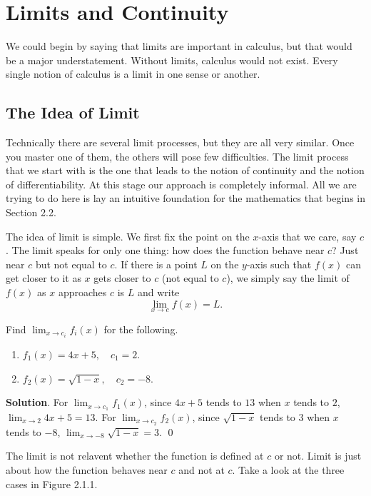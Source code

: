 \documentclass[11pt]{book}
\theoremstyle{break}
\theoremstyle{no_label}
\numberwithin{equation}{section}
\begin{document}
\setlength{\delimitershortfall}{13.5pt}

\chapter{Limits and Continuity}

We could begin by saying that limits are important in calculus, but that would be a major understatement. Without limits, calculus would not exist. Every single notion of calculus is a limit in one sense or another.

\section{The Idea of Limit}

Technically there are several limit processes, but they are all very similar. Once you master one of them, the others will pose few difficulties. The limit process that we start with is the one that leads to the notion of continuity and the notion of differentiability. At this stage our approach is completely informal. All we are trying to do here is lay an intuitive foundation for the mathematics that begins in Section 2.2.

The idea of limit is simple. We first fix the point on the $x$-axis that we care, say $c$. The limit speaks for only one thing: how does the function behave near $c$? Just near $c$ but not equal to $c$. If there is a point $L$ on the $y$-axis such that $f(x)$ can get closer to it as $x$ gets closer to $c$ (not equal to $c$), we simply say the limit of $f(x)$ as $x$ approaches $c$ is $L$ and write $$\lim_{x\to c}f(x)=L.$$

\begin{example}
    Find $\displaystyle\lim_{x\to c_i}f_i(x)$ for the following.
    \begin{enumerate}
        \item $f_1(x)=4x+5, \quad c_1=2$.
        \item $f_2(x)=\sqrt{1-x}, \quad c_2=-8$.
    \end{enumerate}
\end{example}
\textbf{Solution}. For $\displaystyle\lim_{x\to c_1}f_1(x)$, since $4x+5$ tends to $13$ when $x$ tends to $2$, $\displaystyle\lim_{x\to 2}4x+5=13$. For $\displaystyle\lim_{x\to c_2}f_2(x)$, since $\sqrt{1-x}$ tends to $3$ when $x$ tends to $-8$, $\displaystyle\lim_{x\to -8}\sqrt{1-x}=3$. \qed

The limit is not relavent whether the function is defined at $c$ or not. Limit is just about how the function behaves near $c$ and not at $c$. Take a look at the three cases in Figure 2.1.1. 
\end{document}
